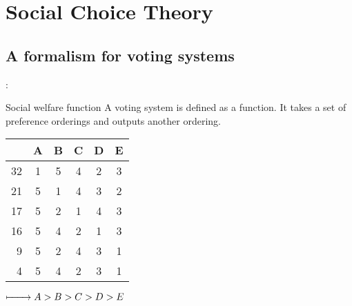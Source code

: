 \documentclass[utf8]{earlywinter}
\begin{document}
\section{Social Choice Theory}
\subsection{A formalism for voting systems}
\begin{frame}{\secname: \subsecname}


%
%
%
  \begin{block}{Social welfare function}
    A voting system is defined as a function. It takes a set of preference orderings and outputs another ordering.
  \end{block}
 

  \begin{minipage}[l]{0.48\linewidth}
    \centering
  \begin{tabular}{r | c c c c c}
       & A & B & C & D & E \\ \hline
    32 & 1 & 5 & 4 & 2 & 3 \\
    21 & 5 & 1 & 4 & 3 & 2 \\
    17 & 5 & 2 & 1 & 4 & 3 \\
    16 & 5 & 4 & 2 & 1 & 3 \\
    9  & 5 & 2 & 4 & 3 & 1 \\
    4  & 5 & 4 & 2 & 3 & 1 \\ 
  \end{tabular}
  \end{minipage}
  \begin{minipage}[r]{0.5\linewidth}
    \centering
    $\xmapsto\qquad A > B > C > D > E$
  \end{minipage}

\end{frame}
\end{document}
